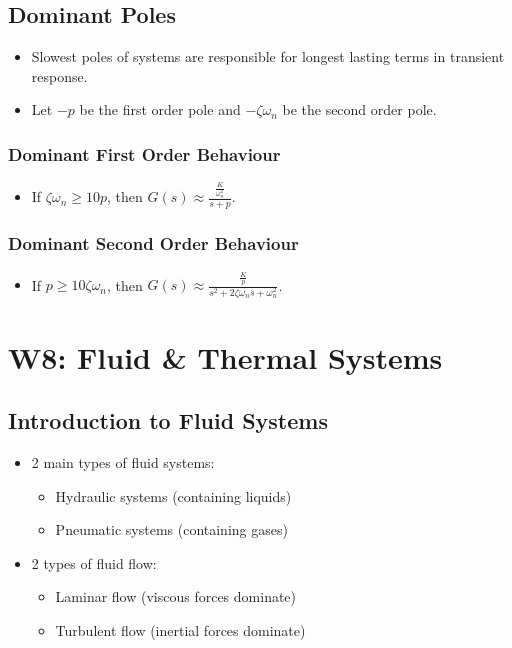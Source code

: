 \documentclass[a4paper]{article}
\begin{document}
\subsection{Dominant Poles}
\begin{itemize}
    \item Slowest poles of systems are responsible for longest lasting terms in transient response.
    \item Let $-p$ be the first order pole and $-\zeta\omega_n$ be the second order pole.
\end{itemize}

\subsubsection{Dominant First Order Behaviour}
\begin{itemize}
    \item If $\zeta\omega_n \geq 10p$, then $G(s) \approx \displaystyle\frac{\frac{K}{\omega_n^2}}{s+p}$.
\end{itemize}

\subsubsection{Dominant Second Order Behaviour}
\begin{itemize}
    \item If $p\geq 10\zeta\omega_n$, then $G(s)\approx\displaystyle\frac{\frac{K}{p}}{s^2+2\zeta\omega_n s+\omega_n^2}$.
\end{itemize}

\newpage
\section{W8: Fluid \& Thermal Systems}

\subsection{Introduction to Fluid Systems}
\begin{itemize}
    \item 2 main types of fluid systems: 
    \begin{itemize}[label=$\circ$]
        \item Hydraulic systems (containing liquids) 
        \item Pneumatic systems (containing gases)
    \end{itemize} 
    \item 2 types of fluid flow:
    \begin{itemize}[label=$\circ$]
        \item Laminar flow (viscous forces dominate)
        \item Turbulent flow (inertial forces dominate)
    \end{itemize}
\end{itemize}
\end{document}
